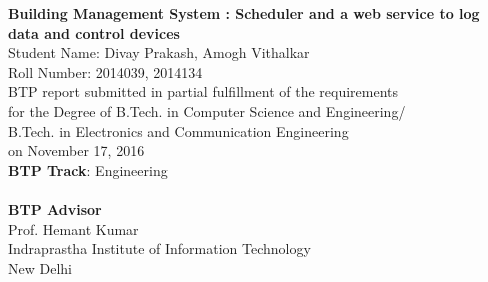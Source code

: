 \def\degreeone{B.Tech. in Computer Science and Engineering}
\def\degreetwo{B.Tech. in Electronics and Communication Engineering}
\def\btptrack{Engineering}
\def\submissiondate{November 17, 2016}
\def\supervisorone{Prof. Hemant Kumar}
\def\studentone{Divay Prakash, Amogh Vithalkar}
\def\rollnumberone{2014039, 2014134}
\def\titlelineone{Building Management System}
\def\titlelinetwo{Scheduler and a web service to log data and control devices}

\thispagestyle{empty}
\vspace{5.65in}

\begin{center}
\vspace{5.65in}
{\LARGE \bf \titlelineone{} : \titlelinetwo{}\\}
\vspace{.3in}
{\Large{Student Name: \studentone{}}}\\  
{\large{Roll Number: \rollnumberone{}}}\\
\vspace{.1in} 
\vspace{.65in}
\vspace{.65in}
{BTP report submitted in partial fulfillment of the requirements 
\\for the Degree of \degreeone{}/\\ \degreetwo{}\\}
on \submissiondate{}\\
\vspace{.65in}
\textbf{BTP Track}: \btptrack\\
\quad\\
{\textbf{BTP Advisor}\\ 
\supervisorone\\} 
\vspace{3.0in}
{Indraprastha Institute of Information Technology\\
New Delhi}
\end{center}
